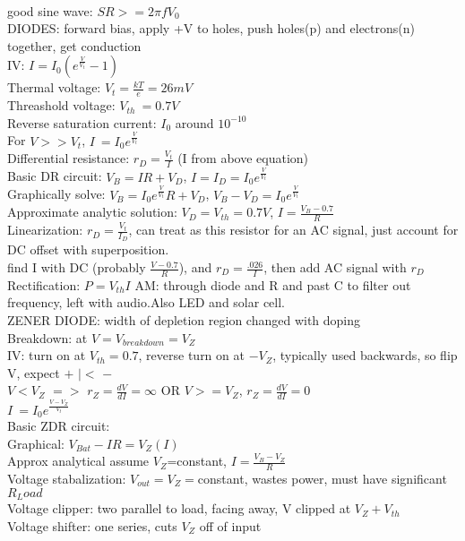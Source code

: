 \documentclass{article}
\begin{document}
\begin{large}
\\good sine wave: $SR>=2\pi f V_0$
\\DIODES:     forward bias, apply +V to holes, push holes(p) and electrons(n) together, get conduction
\\IV: $I=I_0(e^{\frac{V}{V_t}}-1)$
\\Thermal voltage: $V_t=\frac{kT}{e}=26mV$
\\Threashold voltage: $V_{th}~=0.7V$
\\Reverse saturation current: $I_0$ around $10^{-10}$
\\For $V>>V_t$, $I~=I_0e^{\frac{V}{V_t}}$
\\Differential resistance: $r_D=\frac{V_t}{I}$ (I from above equation)
\\Basic DR circuit: $V_B=IR+V_D$, $I=I_D=I_0e^{\frac{V}{V_t}}$
\\Graphically solve: $V_B=I_0e^{\frac{V}{V_t}}R+V_D$, $V_B-V_D=I_0e^{\frac{V}{V_t}}$
\\Approximate analytic solution: $V_D=V_{th}=0.7V$, $I=\frac{V_B-0.7}{R}$
\\Linearization: $r_D=\frac{V_t}{I_D}$, can treat as this resistor for an AC signal, just account for DC offset with superposition.
\\find I with DC (probably $\frac{V-0.7}{R}$), and $r_D=\frac{.026}{I}$, then add AC signal with $r_D$
\\Rectification: $P=V_{th}I$   AM: through diode and R and past C to filter out frequency, left with audio.Also LED and solar cell.
\\ZENER DIODE:  width of depletion region changed with doping
\\Breakdown: at $V=V_{breakdown}=V_Z$
\\IV: turn on at $V_{th}=0.7$, reverse turn on at $-V_Z$, typically used backwards, so flip V, expect $+$   $|<$  $-$
\\$V<V_Z$ $=>$ $r_Z=\frac{dV}{dI}=\infty$ OR $V>=V_Z$, $r_Z=\frac{dV}{dI}=0$
\\$I~=I_0e^{\frac{V-V_Z}{V_t}}$
\\Basic ZDR circuit:
\\Graphical: $V_{Bat}-IR=V_Z(I)$
\\Approx analytical assume $V_Z$=constant, $I=\frac{V_B-V_Z}{R}$
\\Voltage stabalization: $V_{out}=V_Z=$constant, wastes power, must have significant $R_Load$
\\Voltage clipper: two parallel to load, facing away, V clipped at $V_Z+V_{th}$
\\Voltage shifter: one series, cuts $V_Z$ off of input
\newpage\end{large}
\end{document}
